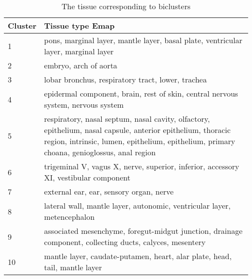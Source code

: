 \documentclass{article}
\begin{document}
\begin{table}
\begin{adjustwidth}{-1in}{-1in}%
	\begin{tabular}{p{1cm}p{15cm}}
\hline
Cluster&Tissue type Emap\\
\hline
\rowcolor{LC}
1&pons, marginal layer, mantle layer, basal plate, ventricular layer, marginal layer\\
2&embryo, arch of aorta\\
\rowcolor{LC}
3&lobar bronchus, respiratory tract, lower, trachea\\
\rowcolor{LC}
4&epidermal component, brain, rest of skin, central nervous system, nervous system\\
\rowcolor{LC}
5&respiratory, nasal septum, nasal cavity, olfactory, epithelium, nasal capsule, anterior epithelium, thoracic region, intrinsic, lumen, epithelium, epithelium, primary choana, genioglossus, anal region\\
\rowcolor{LC}
6&trigeminal V, vagus X, nerve, superior, inferior, accessory XI, vestibular component\\
7&external ear, ear, sensory organ, nerve\\
8&lateral wall, mantle layer, autonomic, ventricular layer, metencephalon\\
9&associated mesenchyme, foregut-midgut junction, drainage component, collecting ducts, calyces, mesentery\\
10&mantle layer, caudate-putamen, heart, alar plate, head, tail, mantle layer\\
\hline
\end{tabular}
\end{adjustwidth}
\caption{The tissue corresponding to biclusters}
\label{tab:tissue}
\end{table}
\end{document}
